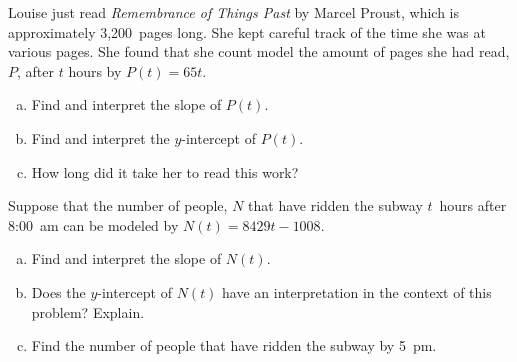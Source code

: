 \documentclass[11pt,letterpaper]{article}
\begin{document}

 Louise just read \textit{Remembrance of Things Past} by Marcel Proust, which is approximately 3,200~pages long. She kept careful track of the time she was at various pages. She found that she count model the amount of pages she had read, $P$, after $t$ hours by $P(t)= 65t$.
	\begin{enumerate}[(a)]
	\item Find and interpret the slope of $P(t)$.
	\item Find and interpret the $y$-intercept of $P(t)$.
	\item How long did it take her to read this work?
	\end{enumerate}



\newpage



 Suppose that the number of people, $N$ that have ridden the subway $t$~hours after 8:00~am can be modeled by $N(t)= 8429t - 1008$. 
	\begin{enumerate}[(a)]
	\item Find and interpret the slope of $N(t)$.
	\item Does the $y$-intercept of $N(t)$ have an interpretation in the context of this problem? Explain.
	\item Find the number of people that have ridden the subway by 5~pm. 
	\end{enumerate}
\end{document}
